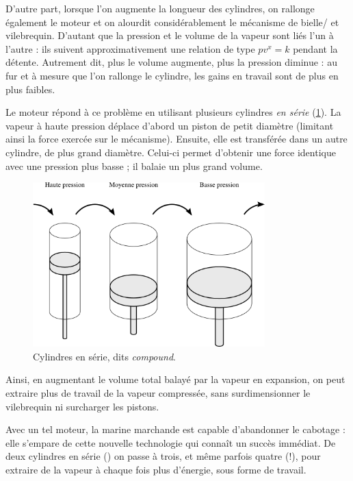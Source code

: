 	D’autre part, lorsque l’on augmente la longueur des cylindres, on rallonge également le moteur et on alourdit considérablement le mécanisme de bielle/ et vile\-brequin. D’autant que la pression et le volume de la vapeur sont liés l’un à l’autre : ils suivent approximativement une relation de type $p v^{x} = k$ pendant la détente. Autrement dit, plus le volume augmente, plus la pression diminue : au fur et à mesure que l’on rallonge le cylindre, les gains en travail sont de plus en plus faibles.

	Le moteur  répond à ce problème en utilisant plusieurs cylindres \textit{en série} (\cref{fig_cylindres_compound}). La vapeur à haute pression déplace d’abord un piston de petit diamètre (limitant ainsi la force exercée sur le mécanisme). Ensuite, elle est transférée dans un autre cylindre, de plus grand diamètre. Celui-ci permet d’obtenir une force identique avec une pression plus basse ; il balaie un plus grand volume.

	\begin{figure}
		\begin{center}
			\includegraphics[width=0.8\textwidth]{images/cylindres_compound.png}
			\vspace{-1cm}
		\end{center}
		\caption{Cylindres en série, dits \textit{compound}.}
		\label{fig_cylindres_compound}
			\vspace{-0.5cm}
	\end{figure}

	Ainsi, en augmentant le volume total balayé par la vapeur en expansion, on peut extraire plus de travail de la vapeur compressée, sans surdimensionner le vilebrequin ni surcharger les pistons.

	Avec un tel moteur, la marine marchande est capable d’abandonner le cabotage : elle s’empare de cette nouvelle technologie qui connaît un succès immédiat. De deux cylindres en série () on passe à trois, et même parfois quatre (!), pour extraire de la vapeur à chaque fois plus d’énergie, sous forme de travail.

